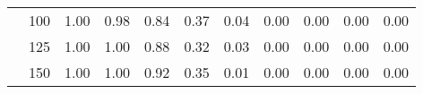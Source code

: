 \begin{table}[t]
\begin{center}
\begin{subtable}[c]{\textwidth}
\begin{center}
\begin{tabular}{rcccccccccc}
                                        & \multicolumn{1}{c|}{100}  & \num{1.00}  & \num{0.98}  & \num{0.84}  & \num{0.37}  & \num{0.04}  & \num{0.00}  & \num{0.00}  & \num{0.00}  & \num{0.00}  \\
                                        & \multicolumn{1}{c|}{125}  & \num{1.00}  & \num{1.00}  & \num{0.88}  & \num{0.32}  & \num{0.03}  & \num{0.00}  & \num{0.00}  & \num{0.00}  & \num{0.00}  \\
                                        & \multicolumn{1}{c|}{150}  & \num{1.00}  & \num{1.00}  & \num{0.92}  & \num{0.35}  & \num{0.01}  & \num{0.00}  & \num{0.00}  & \num{0.00}  & \num{0.00}  \\
                                    \end{tabular}
            \end{center}
        \end{subtable}

        \vspace{5mm}


\end{center}
\end{table}
